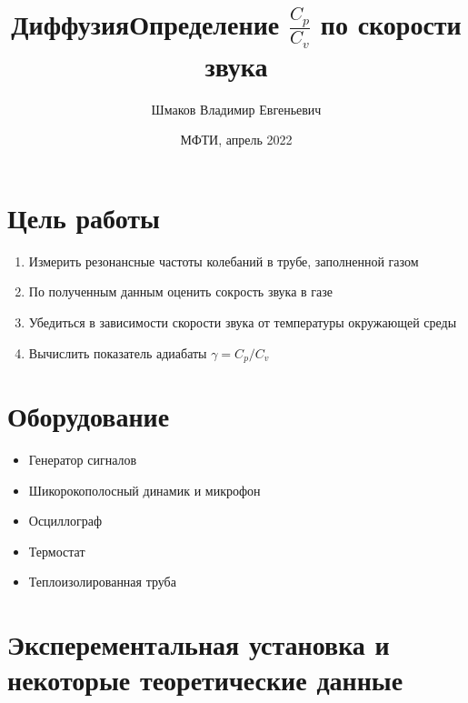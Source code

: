 \documentclass{article}
\title{Диффузия}
\author{Шмаков Владимир Евгеньевич}
\date{МФТИ, апрель 2022}
\title{Определение $\frac{C_p}{C_v}$ по скорости звука}
\begin{document}
\maketitle

\newpage

\section{Цель работы}
\begin{enumerate}
    \item Измерить резонансные частоты колебаний в трубе, заполненной газом
    \item По полученным данным оценить сокрость звука в газе
    \item Убедиться в зависимости скорости звука от температуры окружающей среды
    \item Вычислить показатель адиабаты $\gamma = C_{p}/C_{v}$
\end{enumerate}
\section{Оборудование}
\begin{itemize}
    \item Генератор сигналов
    \item Шикорокополосный динамик и микрофон
    \item Осциллограф
    \item Термостат
    \item Теплоизолированная труба
\end{itemize}
\section{Эксперементальная установка и некоторые теоретические данные}
\end{document}
